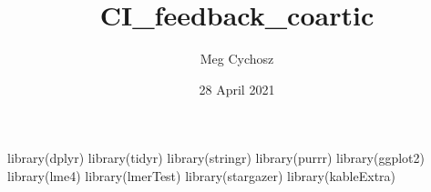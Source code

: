 \documentclass[
]{article}
\title{CI\_feedback\_coartic}
\author{Meg Cychosz}
\date{28 April 2021}
\newenvironment{Shaded}{\begin{snugshade}}{\end{snugshade}}
\newcommand{\FunctionTok}[1]{\textcolor[rgb]{0.00,0.00,0.00}{#1}}
\newcommand{\NormalTok}[1]{#1}
\newcommand{\StringTok}[1]{\textcolor[rgb]{0.31,0.60,0.02}{#1}}
\begin{document}
\maketitle

\begin{Shaded}
\begin{Highlighting}[]
\FunctionTok{library}\NormalTok{(}\StringTok{\textquotesingle{}dplyr\textquotesingle{}}\NormalTok{)}
\FunctionTok{library}\NormalTok{(}\StringTok{\textquotesingle{}tidyr\textquotesingle{}}\NormalTok{)}
\FunctionTok{library}\NormalTok{(}\StringTok{\textquotesingle{}stringr\textquotesingle{}}\NormalTok{)}
\FunctionTok{library}\NormalTok{(}\StringTok{\textquotesingle{}purrr\textquotesingle{}}\NormalTok{)}
\FunctionTok{library}\NormalTok{(}\StringTok{\textquotesingle{}ggplot2\textquotesingle{}}\NormalTok{)}
\FunctionTok{library}\NormalTok{(}\StringTok{\textquotesingle{}lme4\textquotesingle{}}\NormalTok{)}
\FunctionTok{library}\NormalTok{(}\StringTok{\textquotesingle{}lmerTest\textquotesingle{}}\NormalTok{)}
\FunctionTok{library}\NormalTok{(}\StringTok{\textquotesingle{}stargazer\textquotesingle{}}\NormalTok{)}
\FunctionTok{library}\NormalTok{(}\StringTok{\textquotesingle{}kableExtra\textquotesingle{}}\NormalTok{)}
\end{Highlighting}
\end{Shaded}
\end{document}
